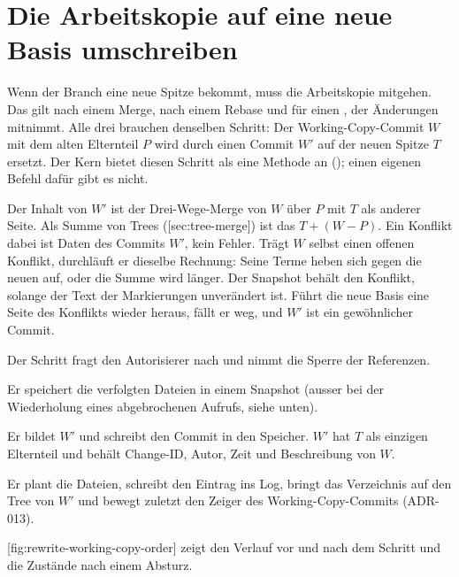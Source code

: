 \section[sec:rewrite-wc]{Die Arbeitskopie auf eine neue Basis umschreiben}
Wenn der Branch eine neue Spitze bekommt, muss die Arbeitskopie mitgehen.
Das gilt nach einem Merge, nach einem Rebase und für einen ,
der Änderungen mitnimmt.
Alle drei brauchen denselben Schritt: Der Working-Copy-Commit $W$ mit dem alten Elternteil $P$
wird durch einen Commit $W'$ auf der neuen Spitze $T$ ersetzt.
Der Kern bietet diesen Schritt als eine Methode an
(); einen eigenen Befehl dafür gibt es nicht.

Der Inhalt von $W'$ ist der Drei-Wege-Merge von $W$ über $P$ mit $T$ als anderer Seite.
Als Summe von Trees ([sec:tree-merge]) ist das $T + (W - P)$.
Ein Konflikt dabei ist Daten des Commits $W'$, kein Fehler.
Trägt $W$ selbst einen offenen Konflikt, durchläuft er dieselbe Rechnung:
Seine Terme heben sich gegen die neuen auf, oder die Summe wird länger.
Der Snapshot behält den Konflikt, solange der Text der Markierungen unverändert ist.
Führt die neue Basis eine Seite des Konflikts wieder heraus, fällt er weg,
und $W'$ ist ein gewöhnlicher Commit.

\startitemize[n]
\item Der Schritt fragt den Autorisierer nach 
und nimmt die Sperre der Referenzen.
\item Er speichert die verfolgten Dateien in einem Snapshot
(ausser bei der Wiederholung eines abgebrochenen Aufrufs, siehe unten).
\item Er bildet $W'$ und schreibt den Commit in den Speicher.
$W'$ hat $T$ als einzigen Elternteil und behält Change-ID, Autor, Zeit und Beschreibung von $W$.
\item Er plant die Dateien, schreibt den Eintrag ins Log, bringt das Verzeichnis auf den Tree von
$W'$ und bewegt zuletzt den Zeiger des Working-Copy-Commits (ADR-013).
\stopitemize

[fig:rewrite-working-copy-order] zeigt den Verlauf vor und nach dem Schritt
und die Zustände nach einem Absturz.

\startplacefigure[title={Den Working-Copy-Commit auf eine neue Spitze umschreiben,
    mit den Zuständen nach einem Absturz},
    reference=fig:rewrite-working-copy-order,location=here]
\stopplacefigure

